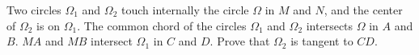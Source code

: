 Two circles $\Omega_1$ and $\Omega_2$ touch internally the circle $\Omega$ in $M$ and $N$, and the center of $\Omega_2$ is on $\Omega_1$. The common chord of the circles $\Omega_1$ and $\Omega_2$ intersects $\Omega$ in $A$ and $B$. $MA$ and $MB$ intersect $\Omega_1$ in $C$ and $D$. Prove that $\Omega_2$ is tangent to $CD$.
